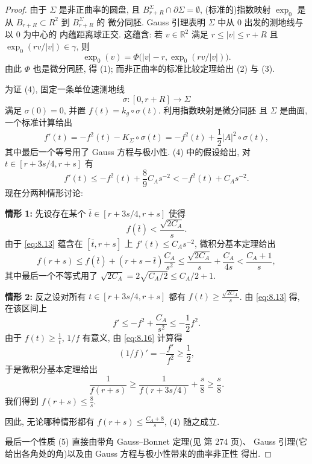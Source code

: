 \begin{proof}
由于 $\Sigma$ 是非正曲率的圆盘, 且 $B_{r+R}^\Sigma\cap\partial\Sigma=\emptyset$,
(标准的)指数映射 $\exp_0$ 是从 $B_{r+R}\subset R^2$ 到 $B_{r+R}^\Sigma$ 的
微分同胚. Gauss 引理表明 $\Sigma$ 中从 $0$ 出发的测地线与以 $0$ 为中心的
内蕴距离球正交. 这蕴含: 若 $v\in\mathbb R^2$ 满足 $r\leq|v|\leq r+R$ 且
$\exp_0(rv/|v|)\in\gamma$, 则
\begin{equation}
\exp_0(v)=\Phi\bigl(|v|-r,\exp_0(rv/|v|)\bigr).
\label{eq:8.11}
\end{equation}
由此 $\Phi$ 也是微分同胚, 得 (1); 而非正曲率的标准比较定理给出 (2) 与 (3).

为证 (4), 固定一条单位速测地线
\[
\sigma:[0,r+R]\to\Sigma
\]
满足 $\sigma(0)=0$, 并置 $f(t)=k_g\circ\sigma(t)$. 利用指数映射是微分同胚
且 $\Sigma$ 是曲面, 一个标准计算给出
\begin{equation}
f'(t)=-f^2(t)-K_\Sigma\circ\sigma(t)
=-f^2(t)+\frac12|A|^2\circ\sigma(t),
\label{eq:8.12}
\end{equation}
其中最后一个等号用了 Gauss 方程与极小性. (4) 中的假设给出, 对
$t\in[r+3s/4,r+s]$ 有
\begin{equation}
f'(t)\leq-f^2(t)+\frac89C_As^{-2}<-f^2(t)+C_As^{-2}.
\label{eq:8.13}
\end{equation}
现在分两种情形讨论:

\textbf{情形 1:} 先设存在某个 $\bar t\in[r+3s/4,r+s]$ 使得
\begin{equation}
f(\bar t)<\frac{\sqrt{2C_A}}{s}.
\label{eq:8.14}
\end{equation}
由于 \eqref{eq:8.13} 蕴含在 $[\bar t,r+s]$ 上 $f'(t)\leq C_As^{-2}$,
微积分基本定理给出
\begin{equation}
f(r+s)\leq f(\bar t)+(r+s-\bar t)\frac{C_A}{s^2}
\leq\frac{\sqrt{2C_A}}{s}+\frac{C_A}{4s}
<\frac{C_A+1}{s},
\label{eq:8.15}
\end{equation}
其中最后一个不等式用了 $\sqrt{2C_A}=2\sqrt{C_A/2}\leq C_A/2+1$.

\textbf{情形 2:} 反之设对所有 $t\in[r+3s/4,r+s]$ 都有
$f(t)\geq\frac{\sqrt{2C_A}}{s}$. 由 \eqref{eq:8.13} 得, 在该区间上
\begin{equation}
f'\leq-f^2+\frac{C_A}{s^2}\leq-\frac12f^2.
\label{eq:8.16}
\end{equation}
由于 $f(t)\geq\frac1t$, $1/f$ 有意义, 由 \eqref{eq:8.16} 计算得
\begin{equation}
(1/f)'=-\frac{f'}{f^2}\geq\frac12,
\label{eq:8.17}
\end{equation}
于是微积分基本定理给出
\begin{equation}
\frac1{f(r+s)}\geq\frac1{f(r+3s/4)}+\frac{s}{8}\geq\frac{s}{8}.
\label{eq:8.18}
\end{equation}
我们得到 $f(r+s)\leq\frac8s$.

因此, 无论哪种情形都有 $f(r+s)\leq\frac{C_A+8}{s}$, (4) 随之成立.

最后一个性质 (5) 直接由带角 Gauss--Bonnet 定理(见 \cite{dC1} 第 274 页)、
Gauss 引理(它给出各角处的角)以及由 Gauss 方程与极小性带来的曲率非正性
得出.
\end{proof}

